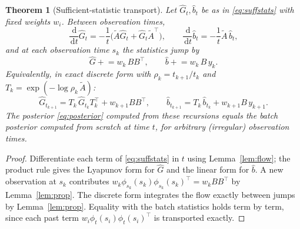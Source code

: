 \documentclass[11pt]{article}
\newtheorem{theorem}{Theorem}
\newcommand{\dd}{\,\mathrm{d}}
\newcommand{\At}{\widetilde{A}}
\newcommand{\Gh}{\widehat{G}}
\newcommand{\bh}{\widehat{b}}
\begin{document}
\begin{theorem}[Sufficient-statistic transport]\label{thm:transport}
Let $\Gh_t,\bh_t$ be as in \eqref{eq:suffstats} with fixed weights $w_i$. Between observation times,
\begin{equation}
    \frac{\dd}{\dd t}\Gh_t=-\frac1t\big(\At\Gh_t+\Gh_t\At^\top\big),
    \qquad
    \frac{\dd}{\dd t}\bh_t=-\frac1t\At\,\bh_t,
\end{equation}
and at each observation time $s_k$ the statistics jump by
\begin{equation}
    \Gh\mathrel{+}=w_k\,BB^\top,\qquad \bh\mathrel{+}=w_k\,B\,y_k.
\end{equation}
Equivalently, in exact discrete form with $\rho_k=t_{k+1}/t_k$ and $T_k=\exp(-\log\rho_k\,\At)$:
\begin{equation}
    \Gh_{t_{k+1}}=T_k\,\Gh_{t_k}T_k^\top+w_{k+1}BB^\top,
    \qquad
    \bh_{t_{k+1}}=T_k\,\bh_{t_k}+w_{k+1}B\,y_{k+1}.
    \label{eq:discrete-recurrence}
\end{equation}
The posterior \eqref{eq:posterior} computed from these recursions equals the batch posterior computed from scratch at time $t$, for arbitrary (irregular) observation times.
\end{theorem}
\begin{proof}
Differentiate each term of \eqref{eq:suffstats} in $t$ using Lemma~\ref{lem:flow}; the product rule gives the Lyapunov form for $\Gh$ and the linear form for $\bh$. A new observation at $s_k$ contributes $w_k\phi_{s_k}(s_k)\phi_{s_k}(s_k)^\top=w_kBB^\top$ by Lemma~\ref{lem:prop}. The discrete form integrates the flow exactly between jumps by Lemma~\ref{lem:prop}. Equality with the batch statistics holds term by term, since each past term $w_i\phi_t(s_i)\phi_t(s_i)^\top$ is transported exactly.
\end{proof}
\end{document}
